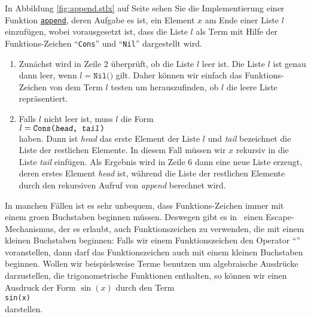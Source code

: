 In Abbildung  \ref{fig:append.stlx} auf Seite \pageref{fig:append.stlx} sehen Sie die
Implementierung  einer Funktion
\href{https://github.com/karlstroetmann/Logik/blob/master/SetlX/append.stlx}{\texttt{append}},
deren Aufgabe es ist, ein Element $x$ am Ende einer Liste $l$ einzuf\"{u}gen, wobei vorausgesetzt ist,
dass die Liste $l$ als Term mit Hilfe der Funktions-Zeichen ``\texttt{Cons}'' und ``\texttt{Nil}''
dargestellt wird.
\begin{enumerate}
\item Zun\"{a}chst wird in Zeile 2 \"{u}berpr\"{u}ft, ob die Liste $l$ leer ist.  Die Liste $l$ ist genau dann
      leer, wenn $l = \texttt{Nil()}$ gilt.  Daher k\"{o}nnen wir einfach das Funktions-Zeichen von dem
      Term $l$ testen um herauszufinden, ob $l$ die leere Liste repr\"{a}sentiert.
\item Falls $l$ nicht leer ist, muss $l$ die Form
      \\[0.2cm]
      \hspace*{1.3cm}
      $l = \texttt{Cons(\textsl{head}, \textsl{tail})}$
      \\[0.2cm]     
      haben.  Dann ist \textsl{head} das erste Element der Liste $l$ und \textsl{tail} bezeichnet
      die Liste der restlichen Elemente.  In diesem Fall m\"{u}ssen wir $x$ rekursiv in die Liste
      \textsl{tail} einf\"{u}gen.  Als Ergebnis wird in Zeile 6 dann eine neue Liste erzeugt, deren
      erstes Element \textsl{head} ist, w\"{a}hrend die Liste der restlichen Elemente durch den
      rekursiven Aufruf von \textsl{append} berechnet wird.
\end{enumerate}
In manchen F\"{a}llen ist es sehr unbequem, dass Funktions-Zeichen immer mit einem gro\3en Buchstaben
beginnen m\"{u}ssen.  Deswegen gibt es in \setl\ einen Escape-Mechanismus, der es erlaubt, auch
Funktionszeichen zu verwenden, die mit einem kleinen Buchstaben beginnen:  Falls wir einem
Funktionszeichen den Operator ``\texttt{}'' voranstellen, dann darf das Funktionszeichen
auch mit einem kleinen Buchstaben beginnen.  Wollen wir beispielsweise Terme benutzen um
algebraische Ausdr\"{u}cke darzustellen, die trigonometrische Funktionen enthalten, 
so k\"{o}nnen wir einen Ausdruck der Form $\sin(x)$ durch den Term
\\[0.2cm]
\hspace*{1.3cm}
\texttt{sin(x)}  
\\[0.2cm]
darstellen.

